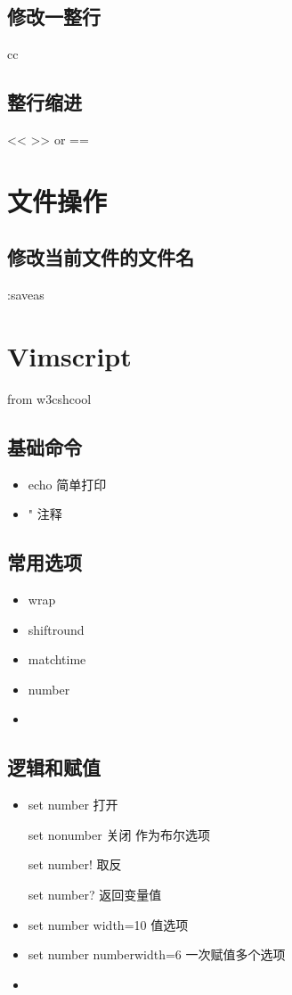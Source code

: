 \documentclass[utf8]{ctexart}
\begin{document}
		\subsection{修改一整行}
		\Large 	cc
		\subsection{整行缩进}
		\Large << >> or  ==
		
		
		\section{文件操作}
		\subsection{修改当前文件的文件名}
        \Large 			:saveas
		
		\section{Vimscript}
		from w3cshcool

		\subsection{基础命令}
		\begin{itemize}
				\item echo 简单打印
				\item  " 注释
		\end{itemize}
		\subsection{常用选项}
		\begin{itemize}
				\item wrap
				\item shiftround
				\item matchtime
				\item number
				\item 				
		\end{itemize}
		

		\subsection{逻辑和赋值}

		\begin{itemize}
				\item set number 打开
			\par set nonumber 关闭 作为布尔选项
			\par set number!    取反	
			\par set number? 返回变量值
				\item set number width=10 值选项
				\item set number numberwidth=6 一次赋值多个选项	
				\item 
				

		\end{itemize}
				
		
		
		
		
			
		
		
		
		
\end{document}
